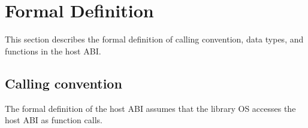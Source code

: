 






\section{Formal Definition}


This section describes the formal definition of calling convention, data types, and functions
in the host ABI.



\subsection{Calling convention}







The formal definition of the host ABI assumes that 
the library OS accesses the host ABI as function calls.







